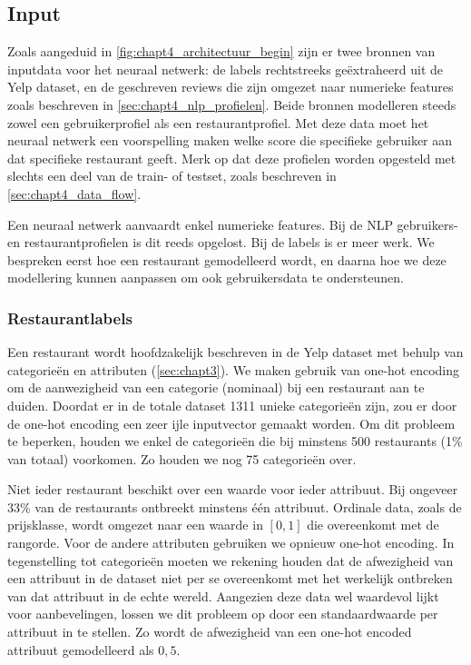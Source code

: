 \subsection{Input}
\label{sec:chapt4_nn_input}
Zoals aangeduid in \autoref{fig:chapt4_architectuur_begin} zijn er twee bronnen van inputdata voor het neuraal netwerk: de labels rechtstreeks geëxtraheerd uit de Yelp dataset, en de geschreven reviews die zijn omgezet naar numerieke features zoals beschreven in \autoref{sec:chapt4_nlp_profielen}. Beide bronnen modelleren steeds zowel een gebruikerprofiel als een restaurantprofiel. Met deze data moet het neuraal netwerk een voorspelling maken welke score die specifieke gebruiker aan dat specifieke restaurant geeft. Merk op dat deze profielen worden opgesteld met slechts een deel van de train- of testset, zoals beschreven in \autoref{sec:chapt4_data_flow}.

Een neuraal netwerk aanvaardt enkel numerieke features. Bij de NLP gebruikers- en restaurantprofielen is dit reeds opgelost. Bij de labels is er meer werk. We bespreken eerst hoe een restaurant gemodelleerd wordt, en daarna hoe we deze modellering kunnen aanpassen om ook gebruikersdata te ondersteunen.

\subsubsection{Restaurantlabels}
\label{sec:chapt4_nn_restaurantlabels}
Een restaurant wordt hoofdzakelijk beschreven in de Yelp dataset met behulp van categorieën en attributen (\autoref{sec:chapt3}). We maken gebruik van one-hot encoding om de aanwezigheid van een categorie (nominaal) bij een restaurant aan te duiden. Doordat er in de totale dataset 1311 unieke categorieën zijn, zou er door de one-hot encoding een zeer ijle inputvector gemaakt worden. Om dit probleem te beperken, houden we enkel de categorieën die bij minstens 500 restaurants (1\% van totaal) voorkomen. Zo houden we nog 75 categorieën over.

Niet ieder restaurant beschikt over een waarde voor ieder attribuut. Bij ongeveer 33\% van de restaurants ontbreekt minstens één attribuut. Ordinale data, zoals de prijsklasse, wordt omgezet naar een waarde in $[0, 1]$ die overeenkomt met de rangorde. Voor de andere attributen gebruiken we opnieuw one-hot encoding. In tegenstelling tot categorieën moeten we rekening houden dat de afwezigheid van een attribuut in de dataset niet per se overeenkomt met het werkelijk ontbreken van dat attribuut in de echte wereld. Aangezien deze data wel waardevol lijkt voor aanbevelingen, lossen we dit probleem op door een standaardwaarde per attribuut in te stellen. Zo wordt de afwezigheid van een one-hot encoded attribuut gemodelleerd als $0,5$.

